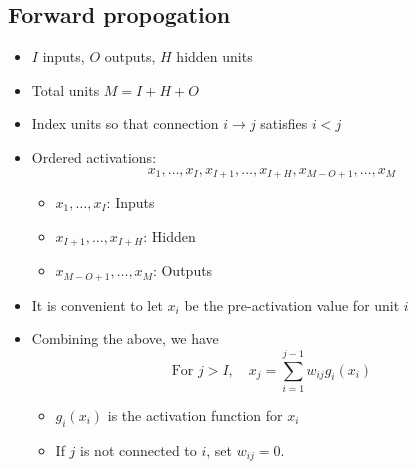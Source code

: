 \subsection{Forward propogation}
\begin{definition}
    \begin{itemize}
        \item $I$ inputs, $O$ outputs, $H$ hidden units
        \item Total units $M = I + H + O$
        \item Index units so that connection $i \rightarrow j$ satisfies $i < j$
        \item Ordered activations:
        \[
        x_1, \ldots, x_I, x_{I+1}, \ldots, x_{I+H}, x_{M-O+1}, \ldots, x_M
        \]
        \begin{itemize}
            \item $x_1, \ldots, x_I$: Inputs
            \item $x_{I+1}, \ldots, x_{I+H}$: Hidden
            \item $x_{M-O+1}, \ldots, x_M$: Outputs
        \end{itemize}
        \item It is convenient to let $x_i$ be the pre-activation value for unit $i$
        \item Combining the above, we have
        \[
        \text{For } j > I, \quad x_j = \sum_{i=1}^{j-1} w_{ij} g_i(x_i)
        \]
        \begin{itemize}
            \item $g_i(x_i)$ is the activation function for $x_i$
            \item If $j$ is not connected to $i$, set $w_{ij} = 0$.
        \end{itemize}
    \end{itemize}
    \vspace{1em}
    

\end{definition}
